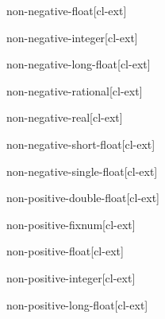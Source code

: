 \documentclass[10pt,english]{book}
\begin{document}
\begin{type}{non-negative-float}{}[cl-ext]
  
\end{type}

\begin{type}{non-negative-integer}{}[cl-ext]
  
\end{type}

\begin{type}{non-negative-long-float}{}[cl-ext]
  
\end{type}

\begin{type}{non-negative-rational}{}[cl-ext]
  
\end{type}

\begin{type}{non-negative-real}{}[cl-ext]
  
\end{type}

\begin{type}{non-negative-short-float}{}[cl-ext]
  
\end{type}

\begin{type}{non-negative-single-float}{}[cl-ext]
  
\end{type}

\begin{type}{non-positive-double-float}{}[cl-ext]
  
\end{type}

\begin{type}{non-positive-fixnum}{}[cl-ext]
  
\end{type}

\begin{type}{non-positive-float}{}[cl-ext]
  
\end{type}

\begin{type}{non-positive-integer}{}[cl-ext]
  
\end{type}

\begin{type}{non-positive-long-float}{}[cl-ext]
  
\end{type}
\end{document}

